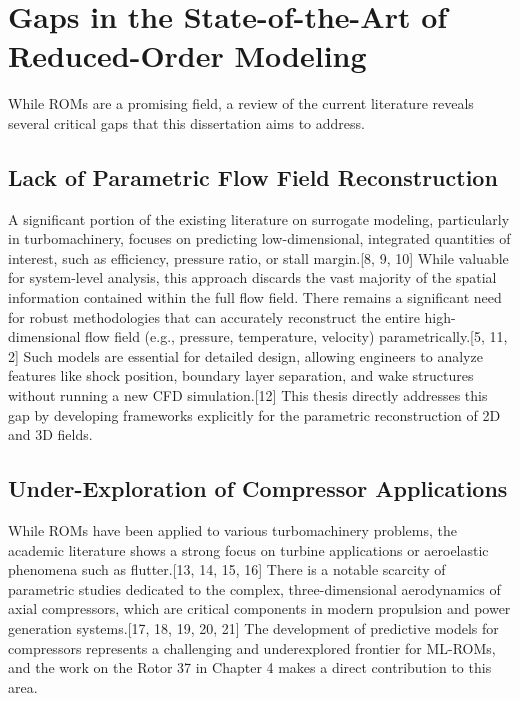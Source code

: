 \documentclass[12pt, a4paper]{report}
\begin{document}
\section{Gaps in the State-of-the-Art of Reduced-Order Modeling}

While ROMs are a promising field, a review of the current literature reveals several critical gaps that this dissertation aims to address.

\subsection{Lack of Parametric Flow Field Reconstruction}
A significant portion of the existing literature on surrogate modeling, particularly in turbomachinery, focuses on predicting low-dimensional, integrated quantities of interest, such as efficiency, pressure ratio, or stall margin.[8, 9, 10] While valuable for system-level analysis, this approach discards the vast majority of the spatial information contained within the full flow field. There remains a significant need for robust methodologies that can accurately reconstruct the entire high-dimensional flow field (e.g., pressure, temperature, velocity) parametrically.[5, 11, 2] Such models are essential for detailed design, allowing engineers to analyze features like shock position, boundary layer separation, and wake structures without running a new CFD simulation.[12] This thesis directly addresses this gap by developing frameworks explicitly for the parametric reconstruction of 2D and 3D fields.

\subsection{Under-Exploration of Compressor Applications}
While ROMs have been applied to various turbomachinery problems, the academic literature shows a strong focus on turbine applications or aeroelastic phenomena such as flutter.[13, 14, 15, 16] There is a notable scarcity of parametric studies dedicated to the complex, three-dimensional aerodynamics of axial compressors, which are critical components in modern propulsion and power generation systems.[17, 18, 19, 20, 21] The development of predictive models for compressors represents a challenging and underexplored frontier for ML-ROMs, and the work on the Rotor 37 in Chapter 4 makes a direct contribution to this area.
\end{document}
